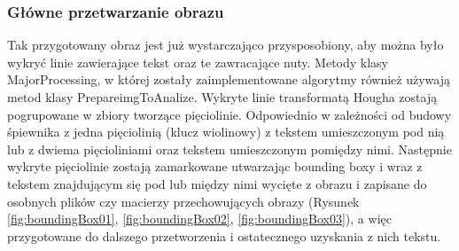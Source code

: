 \documentclass[a4paper,12pt]{article}
\newcommand\spacingIndent{2.2em}
\begin{document}
	    \subsubsection{Główne przetwarzanie obrazu}
		    \hspace{\spacingIndent}  
		    Tak przygotowany obraz jest już wystarczająco przysposobiony, aby można było wykryć linie zawierające tekst oraz te zawracające nuty.
		    Metody klasy MajorProcessing, w której zostały zaimplementowane algorytmy również używają metod klasy PrepareimgToAnalize. Wykryte linie transformatą Hougha zostają     pogrupowane w zbiory tworzące pięciolinie. Odpowiednio w zależności od      budowy śpiewnika z jedna pięciolinią (klucz wiolinowy) z tekstem            umieszczonym pod nią lub z dwiema pięcioliniami oraz tekstem umieszczonym     pomiędzy nimi. Następnie wykryte pięciolinie zostają zamarkowane             utwarzając bounding boxy i wraz z tekstem znajdującym się pod lub między     nimi wycięte z obrazu i zapisane do osobnych plików czy macierzy            przechowujących obrazy (Rysunek \ref{fig:boundingBox01}, \ref{fig:boundingBox02}, \ref{fig:boundingBox03}), a więc przygotowane do dalszego przetworzenia i     ostatecznego uzyskania z nich tekstu.
		
\end{document}
